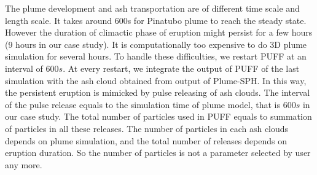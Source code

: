 The plume development and ash transportation are of different time scale and length scale.
It takes around 600s for Pinatubo plume to reach the steady state. However the duration of climactic phase of eruption might persist for a few hours (9 hours in our case study). It is computationally too expensive to do 3D plume simulation for several hours. To handle these difficulties, we restart PUFF at an interval of $600 s$. At every restart, we integrate the output of PUFF of the last simulation with the ash cloud obtained from output of Plume-SPH. In this way, the persistent eruption is mimicked by pulse releasing of ash clouds. The interval of the pulse release equals to the simulation time of plume model, that is $600 s$ in our case study. The total number of particles used in PUFF equals to summation of particles in all these releases. The number of particles in each ash clouds depends on plume simulation, and the total number of releases depends on eruption duration. So the number of particles is not a parameter selected by user any more.

